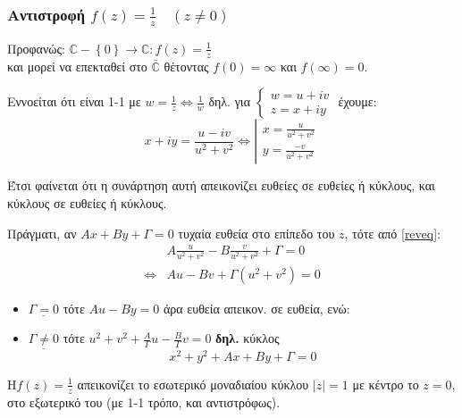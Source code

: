 \documentclass[12pt,a4paper,titlepage,fleqn]{article}
\begin{document}
    \subsubsection{Αντιστροφή \( f(z)=\frac{1}{z} \quad (z \neq 0) \)}
    Προφανώς: \(  \mathbb C - \left\lbrace 0 \right\rbrace \to
    \mathbb C  : f(z) = \frac{1}{z}
     \) \\ και μορεί να επεκταθεί στο \( \bar{\mathbb C} \) θέτοντας
     \( f(0) = \infty \) και \( f(\infty) = 0 \).
     
     Εννοείται ότι είναι 1-1 με \( w = \frac{1}{z} \iff \frac{1}{w} \)
     δηλ. για \( \begin{cases}
     w=u+iv \\ z = x+iy
     \end{cases} \) έχουμε: \begin{equation} \label{reveq}
     x+iy = \frac{u-iv}{u^2+v^2} \iff \left|\begin{array}{l}
     x = \frac{u}{u^2+v^2} \\ y = \frac{-v}{u^2+v^2} 
     \end{array} \right.
     \end{equation}
     
     Έτσι φαίνεται ότι η συνάρτηση αυτή απεικονίζει ευθείες σε ευθείες ή κύκλους,
     και κύκλους σε ευθείες ή κύκλους.
     
     Πράγματι, αν
     \( Ax+By+\Gamma = 0 \) τυχαία ευθεία στο επίπεδο του \( z \), τότε
     από \eqref{reveq}:
     \begin{align*}
     & A\frac{u}{u^2+v^2} - B \frac{v}{u^2+v^2} + \Gamma = 0
     \\ \iff & \boxed{
     	Au-Bv + \Gamma\left( u^2+v^2 \right) = 0
     	}
     \end{align*}
     
     \begin{itemize}
     	\item \( \underline{\Gamma = 0} \) τότε \( Au-By = 0 \) 
     	άρα ευθεία απεικον. σε ευθεία, ενώ:
     	\item \( \underline{\Gamma \neq 0} \) τότε \( 
     	u^2+v^2+\frac{A}{\Gamma}u-\frac{B}{\Gamma}v = 0
     	 \) \textbf{δηλ.} κύκλος
     	 \[
     	 x^2+y^2+Ax+By+\Gamma = 0
     	 \]
     \end{itemize}
     
     Η\( f(z) = \frac{1}{z} \) απεικονίζει το εσωτερικό μοναδιαίου κύκλου
     \( |z| = 1 \) με κέντρο το \( z=0 \), στο εξωτερικό του (με 1-1 τρόπο, και
     αντιστρόφως).
     
\end{document}
